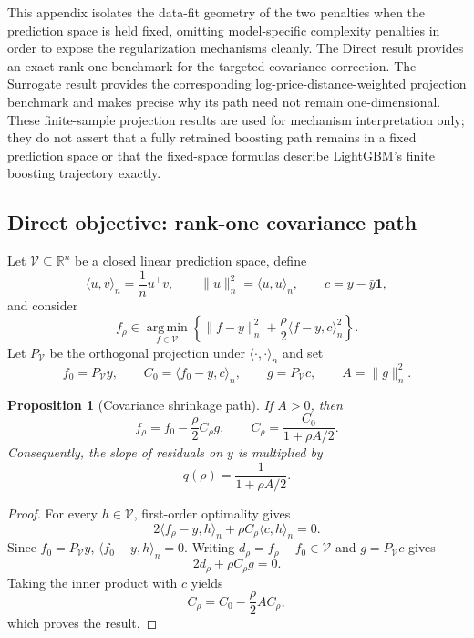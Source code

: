 \documentclass[10pt]{article}
\newtheorem{proposition}{Proposition}
\theoremstyle{definition}
\newcommand{\R}{\mathbb{R}}
\newcommand{\1}{\mathbf{1}}
\newcommand{\Vcal}{\mathcal{V}}
\newcommand{\argminop}{\operatorname*{arg\,min}}
\begin{document}
This appendix isolates the data-fit geometry of the two penalties when the prediction space is held fixed, omitting model-specific complexity penalties in order to expose the regularization mechanisms cleanly. The Direct result provides an exact rank-one benchmark for the targeted covariance correction. The Surrogate result provides the corresponding log-price-distance-weighted projection benchmark and makes precise why its path need not remain one-dimensional. These finite-sample projection results are used for mechanism interpretation only; they do not assert that a fully retrained boosting path remains in a fixed prediction space or that the fixed-space formulas describe LightGBM's finite boosting trajectory exactly.

\subsection{Direct objective: rank-one covariance path}

Let $\Vcal\subseteq\R^n$ be a closed linear prediction space, define
\[
\langle u,v\rangle_n=\frac{1}{n}u^\top v,
\qquad
\|u\|_n^2=\langle u,u\rangle_n,
\qquad
c=y-\bar y\1,
\]
and consider
\begin{equation}
\label{eq:path_problem}
f_\rho\in\argminop_{f\in\Vcal}
\left\{
\|f-y\|_n^2
+\frac{\rho}{2}\langle f-y,c\rangle_n^2
\right\}.
\end{equation}
Let $P_{\Vcal}$ be the orthogonal projection under $\langle\cdot,\cdot\rangle_n$ and set
\[
f_0=P_{\Vcal}y,\qquad
C_0=\langle f_0-y,c\rangle_n,\qquad
g=P_{\Vcal}c,\qquad
A=\|g\|_n^2.
\]

\begin{proposition}[Covariance shrinkage path]
\label{prop:path}
If $A>0$, then
\[
f_\rho=f_0-\frac{\rho}{2}C_\rho g,
\qquad
C_\rho=\frac{C_0}{1+\rho A/2}.
\]
Consequently, the slope of residuals on $y$ is multiplied by
\[
q(\rho)=\frac{1}{1+\rho A/2}.
\]
\end{proposition}

\begin{proof}
For every $h\in\Vcal$, first-order optimality gives
\[
2\langle f_\rho-y,h\rangle_n
+\rho C_\rho\langle c,h\rangle_n=0.
\]
Since $f_0=P_{\Vcal}y$, $\langle f_0-y,h\rangle_n=0$. Writing
$d_\rho=f_\rho-f_0\in\Vcal$ and $g=P_{\Vcal}c$ gives
\[
2d_\rho+\rho C_\rho g=0.
\]
Taking the inner product with $c$ yields
\[
C_\rho=C_0-\frac{\rho}{2}AC_\rho,
\]
which proves the result.
\end{proof}
\end{document}
